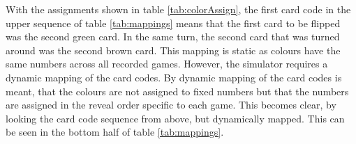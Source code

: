 \begin{minipage}{0.5\textwidth}
	With the assignments shown in table \ref{tab:colorAssign}, the first card code in the upper sequence of table \ref{tab:mappings} means that the first card to be flipped was the second green card. In the same turn, the second card that was turned around was the second brown card. This mapping is static as colours have the same numbers across all recorded games. However, the simulator requires a dynamic mapping of the card codes. By dynamic mapping of the card codes is meant, that the colours are not assigned to fixed numbers but that the numbers are assigned in the reveal order specific to each game. This becomes clear, by looking the card code sequence from above, but dynamically mapped. This can be seen in the bottom half of table \ref{tab:mappings}. 
\end{minipage}
